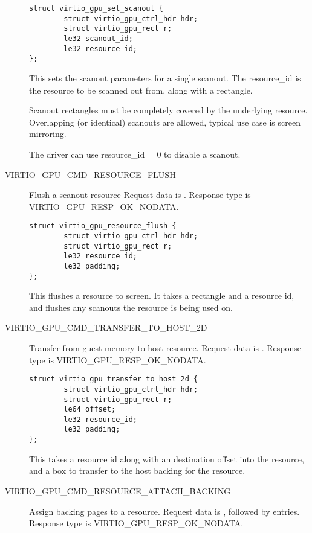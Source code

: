 \begin{description}
\begin{lstlisting}
struct virtio_gpu_set_scanout {
        struct virtio_gpu_ctrl_hdr hdr;
        struct virtio_gpu_rect r;
        le32 scanout_id;
        le32 resource_id;
};
\end{lstlisting}

This sets the scanout parameters for a single scanout. The resource_id
is the resource to be scanned out from, along with a rectangle.

Scanout rectangles must be completely covered by the underlying
resource.  Overlapping (or identical) scanouts are allowed, typical
use case is screen mirroring.

The driver can use resource_id = 0 to disable a scanout.

\item[VIRTIO_GPU_CMD_RESOURCE_FLUSH] Flush a scanout resource Request
  data is .  Response type is
  VIRTIO_GPU_RESP_OK_NODATA.

\begin{lstlisting}
struct virtio_gpu_resource_flush {
        struct virtio_gpu_ctrl_hdr hdr;
        struct virtio_gpu_rect r;
        le32 resource_id;
        le32 padding;
};
\end{lstlisting}

This flushes a resource to screen.  It takes a rectangle and a
resource id, and flushes any scanouts the resource is being used on.

\item[VIRTIO_GPU_CMD_TRANSFER_TO_HOST_2D] Transfer from guest memory
  to host resource.  Request data is .  Response type is
  VIRTIO_GPU_RESP_OK_NODATA.

\begin{lstlisting}
struct virtio_gpu_transfer_to_host_2d {
        struct virtio_gpu_ctrl_hdr hdr;
        struct virtio_gpu_rect r;
        le64 offset;
        le32 resource_id;
        le32 padding;
};
\end{lstlisting}

This takes a resource id along with an destination offset into the
resource, and a box to transfer to the host backing for the resource.

\item[VIRTIO_GPU_CMD_RESOURCE_ATTACH_BACKING] Assign backing pages to
  a resource.  Request data is , followed by  entries.  Response type is
  VIRTIO_GPU_RESP_OK_NODATA.


\end{description}
